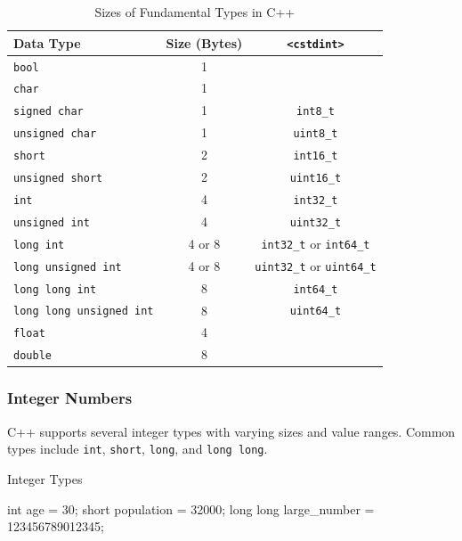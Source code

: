 \begin{table}[H]
    \centering
    \begin{tabular}{|l|c|c|}
        \hline
        \textbf{Data Type} & \textbf{Size (Bytes)} & \textbf{\texttt{<cstdint>}} \\ \hline
        \texttt{bool} & 1 &  \\ \hline
        \texttt{char} & 1 &  \\ \hline
        \texttt{signed char} & 1 & \texttt{int8\_t} \\ \hline
        \texttt{unsigned char} & 1 & \texttt{uint8\_t} \\ \hline
        \texttt{short} & 2 & \texttt{int16\_t} \\ \hline
        \texttt{unsigned short} & 2 & \texttt{uint16\_t} \\ \hline
        \texttt{int} & 4 & \texttt{int32\_t} \\ \hline
        \texttt{unsigned int} & 4 & \texttt{uint32\_t} \\ \hline
        \texttt{long int} & 4 or 8 & \texttt{int32\_t} or \texttt{int64\_t} \\ \hline
        \texttt{long unsigned int} & 4 or 8 & \texttt{uint32\_t} or \texttt{uint64\_t} \\ \hline
        \texttt{long long int} & 8 & \texttt{int64\_t} \\ \hline
        \texttt{long long unsigned int} & 8 & \texttt{uint64\_t} \\ \hline
        \texttt{float} & 4 &  \\ \hline
        \texttt{double} & 8 &  \\ \hline
    \end{tabular}
    \caption{Sizes of Fundamental Types in C++}
\end{table}

\vspace{-2em}
\subsubsection{Integer Numbers}

C++ supports several integer types with varying sizes and value ranges. Common types include \texttt{int}, \texttt{short}, \texttt{long}, and \texttt{long long}.

\begin{exampleblock}{Integer Types} 
    \begin{codeblock}[language=C++]
int age = 30;
short population = 32000;
long long large_number = 123456789012345;
    \end{codeblock}
\end{exampleblock}

